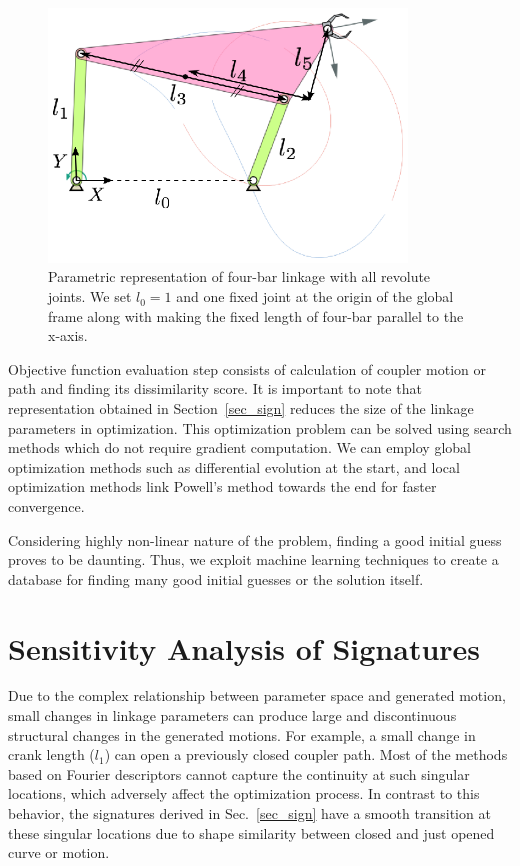 \documentclass[twocolumn,10pt]{asme2e}
\begin{document}
\begin{figure}
\centering
\includegraphics[width=270pt]{figure/fig_fourbar.eps}
  \caption{Parametric representation of four-bar linkage with all revolute joints. We set $l_0 = 1$ and one fixed joint at the origin of the global frame along with making the fixed length of four-bar parallel to the x-axis.}
\label{fourbar}
\end{figure}

Objective function evaluation step consists of calculation of coupler motion or path and finding its dissimilarity score.
It is important to note that representation obtained in Section~\ref{sec_sign} reduces the size of the linkage parameters in optimization.
This optimization problem can be solved using search methods which do not require gradient computation.
We can employ global optimization methods such as differential evolution at the start, and local optimization methods link Powell's method towards the end for faster convergence\cite{ullah1997}.

Considering highly non-linear nature of the problem, finding a good initial guess proves to be daunting.
Thus, we exploit machine learning techniques to create a database for finding many good initial guesses or the solution itself.

\section{Sensitivity Analysis of Signatures}\label{sec_SA}
Due to the complex relationship between parameter space and generated motion, small changes in linkage parameters can produce large and discontinuous structural changes in the generated motions.
For example, a small change in crank length ($l_1$) can open a previously closed coupler path.
Most of the methods based on Fourier descriptors cannot capture the continuity at such singular locations, which adversely affect the optimization process.
In contrast to this behavior, the signatures derived in Sec.~\ref{sec_sign} have a smooth transition at these singular locations due to shape similarity between closed and just opened curve or motion.
\end{document}

